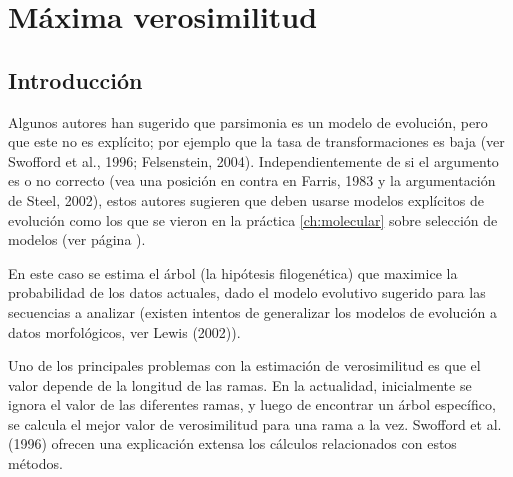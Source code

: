 \chapter{M\'axima verosimilitud}
\section*{Introducci\'on}
\label{ch:likelihood}

Algunos autores han sugerido que parsimonia es un modelo de evoluci\'on, pero que este no es expl\'icito; por ejemplo que la tasa de transformaciones es baja (ver Swofford et al., 1996; Felsenstein, 2004). Independientemente de si el argumento es o no correcto (vea una posici\'on en contra en Farris, 1983 y la argumentaci\'on de Steel, 2002), estos autores sugieren que deben usarse modelos expl\'icitos de evoluci\'on como los que se vieron en la pr\'actica \ref{ch:molecular} sobre selecci\'on de modelos (ver p\'agina \pageref{ch:molecular}).

En este caso se estima el \'arbol (la hip\'otesis filogen\'etica) que maximice la probabilidad de los datos actuales, dado el modelo evolutivo sugerido para las secuencias a analizar (existen intentos de generalizar los modelos de evoluci\'on a datos morfol\'ogicos, ver  Lewis (2002)).

Uno de los principales problemas con la estimaci\'on de verosimilitud es que el valor depende de la longitud de las ramas. En la actualidad, inicialmente se ignora el valor de las diferentes ramas, y luego de encontrar un \'arbol espec\'ifico, se calcula el mejor valor de verosimilitud para una rama a la vez. Swofford et al. (1996) ofrecen una explicaci\'on extensa los c\'alculos relacionados con estos m\'etodos.

